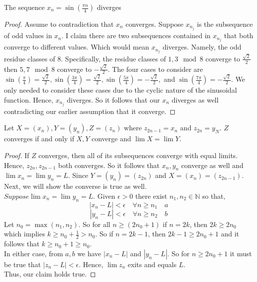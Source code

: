 \documentclass[12pt]{article}
\newcommand{\N}{\mathbb{N}}
\newenvironment{claim}[2][Claim]{\begin{trivlist}
		\item[\hskip \labelsep {\bfseries #1}\hskip \labelsep {\bfseries #2}]}{\end{trivlist}}
\begin{document}
\begin{claim}{3.4.4b}
	The sequence $x_n=\sin(\frac{\pi n}{4})$ diverges
\end{claim}
\begin{proof}
		Assume to contradiction that $x_n$ converges. 
		Suppose $x_{n_j}$ is the subsequence of odd values in $x_n$. 
		I claim there are two subsequences contained in $x_{n_j}$ that both converge to different values. Which would mean $x_{n_j}$ diverges.
		Namely, the odd residue classes of $8$. Specifically, the residue classes of $1,3 \mod 8$ converge to $\frac{\sqrt{2}}{2}$ then $5,7 \mod 8$ converge to $-\frac{\sqrt{2}}{2}$. 
		The four cases to consider are $\sin(\frac{\pi}{4})  = \frac{\sqrt{2}}{2}, \sin(\frac{3\pi}{4})  = \frac{\sqrt{2}}{2}, \sin(\frac{5\pi}{4})  = -\frac{\sqrt{2}}{2}, $ and $\sin(\frac{7\pi}{4})  = -\frac{\sqrt{2}}{2}$. We only needed to consider these cases due to the cyclic nature of the sinusoidal function. Hence, $x_{n_j}$ diverges. So it follows that our $x_n$ diverges as well contradicting our earlier assumption that it converge. 
\end{proof}
\newpage
\begin{claim}{3.4.5}
	Let $X = (x_n), Y = (y_n), Z = (z_n)$ where $z_{2n - 1} = x_n$ and $z_{2n} = y_N$. $Z$ converges if and only if $X,Y$ converge and $\lim X = \lim Y$.
\end{claim}
\begin{proof}
	If $Z$ converges, then all of its subsequences converge with equal limits. Hence, $z_{2n}, z_{2n-1}$ both converges. So it follows that $x_n,y_n$ converge as well and $\lim x_n = \lim y_n = L$. Since $Y = (y_n) = (z_{2n})$ and $X = (x_n) = (z_{2n -1})$.\\
	Next, we will show the converse is true as well.\\
	$Suppose \lim x_n = \lim y_n = L$. 	Given $\epsilon > 0$ there exist $n_1, n_2 \in \N$ so that,
	\[ | x_n - L | < \epsilon \quad  \forall n \geq n_1  \quad a  \]
	\[ | y_n - L | < \epsilon  \quad \forall n \geq n_2  \quad b \] 
	Let $n_0 = \max(n_1, n_2)$. So for all $n \geq (2n_0 + 1)$ if $n = 2k$, then $2k \geq 2 n_0$ which implies $k \geq n_0 + \frac{1}{2} > n_0 $. So if $n = 2k - 1$, then $2k - 1 \geq 2n_0 + 1$ and it follows that $k \geq n_0 + 1 \geq n_0$.\\
	In either case, from $a,b$ we have $| x_n - L |$ and $| y_n - L |$. So for $n \geq 2n_0 + 1$ it must be true that $| z_n - L | < \epsilon$. Hence, $\lim z_n$ exits and equals $L$.
	\\Thus, our claim holds true.
\end{proof}
\end{document}
